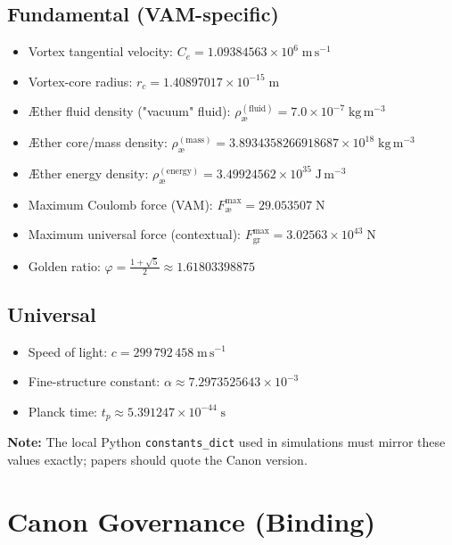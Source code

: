 \documentclass[11pt, a4paper]{article}
\begin{document}
\subsection{Fundamental (VAM-specific)}
\begin{itemize}
    \item Vortex tangential velocity: $C_e = 1.09384563 \times 10^{6}\;\mathrm{m}\,\mathrm{s}^{-1}$
    \item Vortex-core radius: $r_c = 1.40897017 \times 10^{-15}\;\mathrm{m}$
    \item Æther fluid density ("vacuum" fluid): $\rho_{\text{\ae}}^{(\text{fluid})} = 7.0 \times 10^{-7}\;\mathrm{kg}\,\mathrm{m}^{-3}$
    \item Æther core/mass density: $\rho_{\text{\ae}}^{(\text{mass})} = 3.8934358266918687 \times 10^{18}\;\mathrm{kg}\,\mathrm{m}^{-3}$
    \item Æther energy density: $\rho_{\text{\ae}}^{(\text{energy})} = 3.49924562 \times 10^{35}\;\mathrm{J}\,\mathrm{m}^{-3}$
    \item Maximum Coulomb force (VAM): $F_{\text{\ae}}^{\max} = 29.053507\;\mathrm{N}$
    \item Maximum universal force (contextual): $F_{\text{gr}}^{\max} = 3.02563 \times 10^{43}\;\mathrm{N}$
    \item Golden ratio: $\varphi = \frac{1+\sqrt{5}}{2} \approx 1.61803398875$
\end{itemize}

\subsection{Universal}
\begin{itemize}
    \item Speed of light: $c = 299\,792\,458\;\mathrm{m}\,\mathrm{s}^{-1}$
    \item Fine-structure constant: $\alpha \approx 7.2973525643 \times 10^{-3}$
    \item Planck time: $t_p \approx 5.391247 \times 10^{-44}\;\mathrm{s}$
\end{itemize}

\textbf{Note:} The local Python \texttt{constants\_dict} used in simulations must mirror these values exactly; papers should quote the Canon version.

    \section*{Canon Governance (Binding)}
\end{document}
